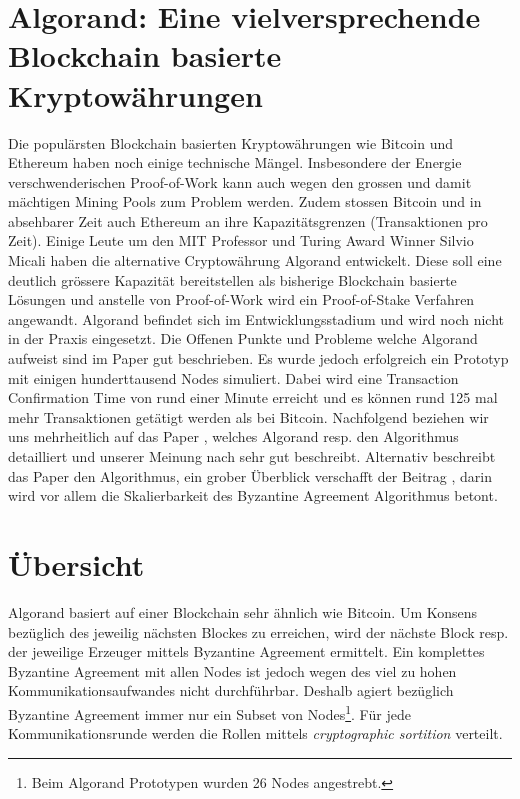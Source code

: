 \documentclass[11pt,a4paper]{article}
\author{Heinz Hofmann und Jonas Schmid}
\begin{document}
\section*{ \center \textbf{\LARGE Algorand: Eine vielversprechende Blockchain basierte Kryptow\"ahrungen}}

Die populärsten Blockchain basierten Kryptow\"ahrungen wie Bitcoin und Ethereum haben noch einige technische M\"angel.
Insbesondere der Energie verschwenderischen Proof-of-Work kann auch wegen den grossen
und damit m\"achtigen Mining Pools zum Problem werden.
Zudem stossen Bitcoin und in absehbarer Zeit auch Ethereum an ihre Kapazit\"atsgrenzen (Transaktionen pro Zeit).
Einige Leute um den MIT Professor und Turing Award Winner Silvio Micali haben die alternative Cryptow\"ahrung Algorand entwickelt.
Diese soll eine deutlich gr\"ossere Kapazit\"at bereitstellen als bisherige Blockchain basierte L\"osungen und anstelle von Proof-of-Work wird ein Proof-of-Stake Verfahren angewandt.
Algorand befindet sich im Entwicklungsstadium und wird noch nicht in der Praxis eingesetzt.
Die Offenen Punkte und Probleme welche Algorand aufweist sind im Paper gut beschrieben.
Es wurde jedoch erfolgreich ein Prototyp mit einigen hunderttausend Nodes simuliert\cite[Kapitel Implementation \& Evaluation]{Gilad:2017:ASB:3132747.3132757}.
Dabei wird eine \grqq{}Transaction Confirmation Time\grqq{} von rund einer Minute erreicht und es k\"onnen rund 125 mal mehr Transaktionen get\"atigt werden als bei Bitcoin.
Nachfolgend beziehen wir uns mehrheitlich auf das Paper \cite{Gilad:2017:ASB:3132747.3132757},
welches Algorand resp. den Algorithmus detailliert und unserer Meinung nach sehr gut beschreibt.
Alternativ beschreibt das Paper \cite{Chen:2017} den Algorithmus,
ein grober \"Uberblick verschafft der Beitrag \cite{ScalingConsensus},
darin wird vor allem die Skalierbarkeit des Byzantine Agreement Algorithmus betont.

\section*{\"Ubersicht}
Algorand basiert auf einer Blockchain sehr \"ahnlich wie Bitcoin.
Um Konsens bez\"uglich des jeweilig n\"achsten Blockes zu erreichen,
wird der n\"achste Block resp. der jeweilige Erzeuger mittels Byzantine Agreement ermittelt.
Ein komplettes Byzantine Agreement mit allen Nodes ist jedoch wegen des viel zu hohen Kommunikationsaufwandes nicht durchf\"uhrbar.
Deshalb agiert bez\"uglich Byzantine Agreement immer nur ein Subset von Nodes\footnote{Beim Algorand Prototypen wurden 26 Nodes angestrebt.}.
F\"ur jede Kommunikationsrunde werden die Rollen mittels \textit{cryptographic sortition} verteilt.
\end{document}
